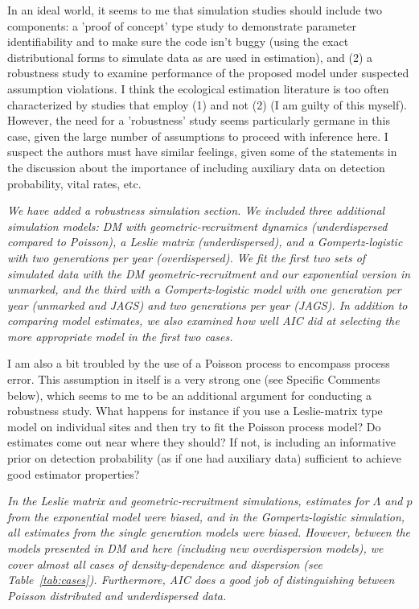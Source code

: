 \documentclass[12pt,english]{article}
\begin{document}
\begin{spacing}{1.9}
\begin{flushleft}
In an ideal world, it seems to me that simulation studies should include two components: a 
'proof of concept' type study to demonstrate parameter identifiability and to make sure the code 
isn't buggy (using the exact distributional forms to simulate data as are used in estimation), and 
(2) a robustness study to examine performance of the proposed model under suspected assumption 
violations. I think the ecological estimation literature is too often characterized by studies that 
employ (1) and not (2) (I am guilty of this myself). However, the need for a 'robustness' study seems 
particularly germane in this case, given the large number of assumptions to proceed with inference here. 
I suspect the authors must have similar feelings, given some of the statements in the discussion about 
the importance of including auxiliary data on detection probability, vital rates, etc.

\vspace{0.5cm}
\textit{We have added a robustness simulation section. We included three additional simulation models:
DM with geometric-recruitment dynamics (underdispersed compared to Poisson), a Leslie matrix (underdispersed),
and a Gompertz-logistic with two generations per year (overdispersed). We fit the first two sets of simulated
data with the DM geometric-recruitment and our exponential version in unmarked, and the third with
a Gompertz-logistic model with one generation per year (unmarked and JAGS) and two generations
per year (JAGS).  In addition to comparing model estimates, we also examined how well AIC did at
selecting the more appropriate model in the first two cases.}
\vspace{0.5cm}

I am also a bit troubled by the use of a Poisson process to encompass process error. This assumption 
in itself is a very strong one (see Specific Comments below), which seems to me to be an additional 
argument for conducting a robustness study. What happens for instance if you use a Leslie-matrix 
type model on individual sites and then try to fit the Poisson process model? Do estimates come out 
near where they should? If not, is including an informative prior on detection probability (as if one 
had auxiliary data) sufficient to achieve good estimator properties?

\vspace{0.5cm}
\textit{In the Leslie matrix and geometric-recruitment simulations, estimates for $\Lambda$ and $p$ from
the exponential model were biased, and in the Gompertz-logistic simulation, all estimates from the single
generation models were biased.  However, between the models presented in DM and here (including new 
overdispersion models), we cover almost
all cases of density-dependence and dispersion (see Table~\ref{tab:cases}).  Furthermore, AIC does a good job of distinguishing
between Poisson distributed and underdispersed data.}


\end{flushleft}
\end{spacing}
\end{document}
